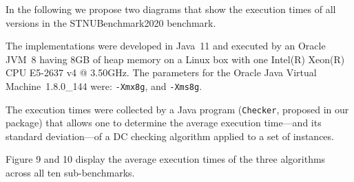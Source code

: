 \documentclass[a4paper,11pt]{article}
\begin{document}
In the following we propose two diagrams that show the execution times of all versions in the STNUBenchmark2020 benchmark.

The implementations were developed in Java~11 and executed by an Oracle 
JVM~8 having 8GB of heap memory on a Linux box with one Intel(R) Xeon(R) CPU E5-2637 v4 @ 3.50GHz.
The parameters for the Oracle Java Virtual Machine~1.8.0\_144 were: \texttt{-Xmx8g}, and \texttt{-Xms8g}. 

The execution times were collected by a Java program (\texttt{Checker}, proposed in our package) that allows one to determine the average execution time---and its standard deviation---of a DC checking algorithm applied to a set of instances.



Figure 9 and 10 display the average execution times of the three algorithms across all ten sub-benchmarks.





\renewcommand{\yerrstd}{1.972*\thisrow{yerr}/(\thisrow{n}^.5)}%
\newcommand{\eerrstd}{1.972*\thisrow{eerr}/(\thisrow{n}^.5)}%
\newcommand{\cerrstd}{1.972*\thisrow{cerr}/(\thisrow{n}^.5)}%


\testOneMorrisDC
\end{document}
